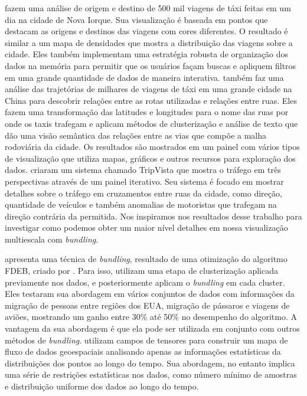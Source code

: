 \citet{Ferreira2013} fazem uma análise de origem e destino de 500 mil viagens
de táxi feitas em um dia na cidade de Nova Iorque. Sua visualização é baseada
em pontos que destacam as origens e destinos das viagens com cores diferentes.
O resultado é similar a um mapa de densidades que mostra a distribuição das
viagens sobre a cidade. Eles também implementam uma estratégia robusta de
organização dos dados na memória para permitir que os usuários façam buscas e
apliquem filtros em uma grande quantidade de dados de maneira interativa.
\citet{Chu2014} também faz uma análise das trajetórias de milhares de viagens
de táxi em uma grande cidade na China para descobrir relações entre as rotas
utilizadas e relações entre ruas. Eles fazem uma transformação das latitudes e
longitudes para o nome das ruas por onde os taxis trafegam e aplicam métodos de
clusterização e análise de texto que dão uma visão semântica das relações entre
as vias que compõe a malha rodoviária da cidade. Os resultados são mostrados em
um painel com vários tipos de visualização que utiliza mapas, gráficos e outros
recursos para exploração dos dados. \citet{Guo2011} criaram um sistema chamado
TripVista que mostra o tráfego em três perspectivas através de um painel iterativo.
Seu sistema é focado em mostrar detalhes sobre o tráfego em cruzamentos entre
ruas da cidade, como direção, quantidade de veículos e também anomalias de motoristas
que trafegam na direção contrária da permitida. Nos inspiramos nos resultados
desse trabalho para investigar como podemos obter um maior nível detalhes em
nossa visualização multiescala com \emph{bundling}.

\citet{Anita2017} apresenta uma técnica de \emph{bundling}, resultado de uma
otimização do algoritmo FDEB, criado por \citet{Selassie2011}. Para isso,
utilizam uma etapa de clusterização aplicada previamente nos dados, e
posteriormente aplicam o \emph{bundling} em cada cluster. Eles testaram sua
abordagem em vários conjuntos de dados com informações da migração de pessoas
entre regiões dos EUA, migração de pássaros e viagens de aviões, mostrando um
ganho entre 30\% até 50\% no desempenho do algoritmo. A vantagem da sua
abordagem é que ela pode ser utilizada em conjunto com outros métodos de
\emph{bundling}.  \citet{Kim2018} utilizam campos de tensores para construir um
mapa de fluxo de dados geoespaciais analisando apenas as informações
estatísticas da distribuições dos pontos ao longo do tempo. Sua abordagem, no
entanto implica uma série de restrições estatísticas nos dados, como número
mínimo de amostras e distribuição uniforme dos dados ao longo do tempo.

